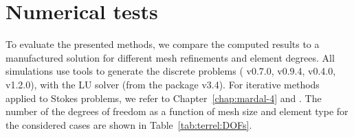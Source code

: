 \section{Numerical tests}
\label{sec:terrel:Results}

To evaluate the presented methods, we compare the computed results to
a manufactured solution for different mesh refinements and element
degrees. All simulations use \fenics{} tools to generate the
discrete problems (\ffc{} v0.7.0, \dolfin{} v0.9.4, \ufl{} v0.4.0,
\ufc{} v1.2.0), with the  LU solver (from the
 package v3.4).  For iterative methods
applied to Stokes problems, we refer to Chapter~\ref{chap:mardal-4}
and \citet{ElmanSilvesterWathen2005}.  The number of the degrees of
freedom as a function of mesh size and element type for the considered
cases are shown in Table~\ref{tab:terrel:DOFs}.


